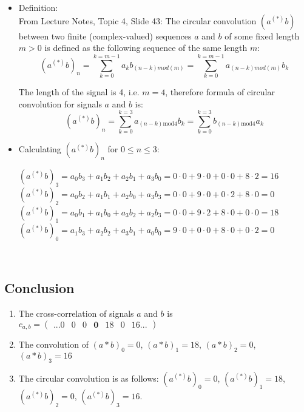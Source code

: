 \documentclass[12pt,a4paper]{article}
\begin{document}
    \begin{itemize}
    
        \item Definition:\\
        From Lecture Notes, Topic 4, Slide 43: The circular convolution $(a^{(*)} b)$ between two finite (complex-valued) sequences $a$ and $b$ of some fixed length $m > 0$ is defined as the following sequence of the same length $m$:
        $$ (a^{(*)} b)_n = \sum_{k=0}^{k=m-1}a_kb_{(n-k)mod(m)}  = \sum_{k=0}^{k=m-1}a_{(n-k)mod(m)}b_k$$
        
        The length of the signal is 4, i.e. $m=4$, therefore formula of circular convolution for signals $a$ and $b$ is:
    $$(a^{(*)}b)_n=\sum^{k=3}_{k=0}a_{(n-k)\text{mod}4}b_k=\sum^{k=3}_{k=0}b_{(n-k)\text{mod}4}a_k$$
        
        \item Calculating $(a^{(*)} b)_n$ for $0 \leq n \leq 3$:
        
        $(a^{(*)} b)_3 = a_0b_3 + a_1b_2 + a_2b_1 + a_3b_0 = 0\cdot 0 + 9\cdot 0 + 0\cdot 0 + 8\cdot 2    = 16$ \\
        $(a^{(*)} b)_2 = a_0b_2 + a_1b_1 + a_2b_0 + a_3b_3 = 0\cdot 0 + 9\cdot 0 + 0\cdot 2 + 8\cdot 0 = 0$ \\
        $(a^{(*)} b)_1 = a_0b_1 + a_1b_0 + a_3b_2 + a_2b_3 = 0\cdot 0 + 9\cdot 2 + 8\cdot 0 + 0\cdot 0 = 18$ \\
        $(a^{(*)} b)_0 = a_1b_3 + a_2b_2 + a_3b_1 + a_0b_0 = 9\cdot 0 + 0\cdot 0 + 8\cdot 0 + 0\cdot 2 = 0$

        
    \end{itemize}\
    
    
    \subsection{Conclusion}
    \begin{enumerate}
        \item The cross-correlation of signals $a$ and $b$ is $c_{a,b} = \begin{pmatrix}...0 & 0 & 0 & \boldsymbol{0} & 18 & 0 & 16... \end{pmatrix}$
        
        \item The convolution of $(a * b)_0 = 0$, $(a * b)_1 = 18$, $(a * b)_2 = 0$, $(a * b)_3 = 16$
        
        \item The circular convolution is as follows: $(a^{(*)} b)_0 = 0$, $(a^{(*)} b)_1 = 18$, $(a^{(*)} b)_2 = 0$, $(a^{(*)} b)_3 = 16$.
     
    \end{enumerate}
     
\end{document}
